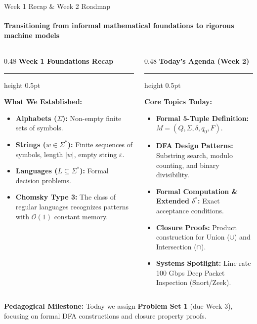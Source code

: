 \documentclass[aspectratio=169, 10pt]{beamer}
\newcommand{\colheader}[1]{%
  {\noindent\footnotesize\bfseries\color{gimpanavy}#1}%
  \vspace{0.02cm}%
  {\color{gimpanavy!30}\hrule height 0.5pt}%
  \vspace{0.05cm}%
}
\newcommand{\cardtitle}[1]{{\noindent\footnotesize\bfseries\color{gimpanavy}#1}\par\vspace{0.03cm}}
\begin{document}
\begin{frame}{Week 1 Recap \& Week 2 Roadmap}
  \framesubtitle{Transitioning from informal mathematical foundations to rigorous machine models}
  
  \begin{columns}[T]
    \begin{column}{0.48\textwidth}
      \colheader{Week 1 Foundations Recap}
      \begin{tcolorbox}[conceptcard]
        \cardtitle{What We Established:}
        \begin{itemize}\setlength{\itemsep}{2pt}\scriptsize
          \item \textbf{Alphabets ($\Sigma$):} Non-empty finite sets of symbols.
          \item \textbf{Strings ($w \in \Sigma^*$):} Finite sequences of symbols, length $|w|$, empty string $\varepsilon$.
          \item \textbf{Languages ($L \subseteq \Sigma^*$):} Formal decision problems.
          \item \textbf{Chomsky Type 3:} The class of regular languages recognizes patterns with $\mathcal{O}(1)$ constant memory.
        \end{itemize}
      \end{tcolorbox}
    \end{column}
    
    \begin{column}{0.48\textwidth}
      \colheader{Today's Agenda (Week 2)}
      \begin{tcolorbox}[spotlightcard]
        \cardtitle{Core Topics Today:}
        \begin{itemize}\setlength{\itemsep}{2pt}\scriptsize
          \item \textbf{Formal 5-Tuple Definition:} $M = (Q, \Sigma, \delta, q_0, F)$.
          \item \textbf{DFA Design Patterns:} Substring search, modulo counting, and binary divisibility.
          \item \textbf{Formal Computation \& Extended $\delta^*$:} Exact acceptance conditions.
          \item \textbf{Closure Proofs:} Product construction for Union ($\cup$) and Intersection ($\cap$).
          \item \textbf{Systems Spotlight:} Line-rate 100 Gbps Deep Packet Inspection (Snort/Zeek).
        \end{itemize}
      \end{tcolorbox}
    \end{column}
  \end{columns}
  
  \vspace{0.08cm}
  \begin{tcolorbox}[alertcard]
    {\scriptsize\textbf{Pedagogical Milestone:} Today we assign \textbf{Problem Set 1} (due Week 3), focusing on formal DFA constructions and closure property proofs.}
  \end{tcolorbox}
\end{frame}
\end{document}
